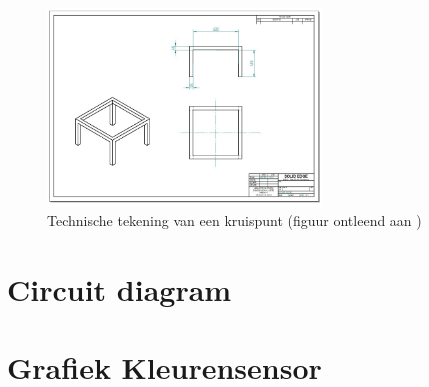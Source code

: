 \documentclass[a4paper,kulak]{kulakarticle}
\begin{document}
\begin{appendices}
\begin{figure}[h]
	\centering
	\includegraphics[width=0.65\textwidth]{tafelstel.png}
	\caption{Technische tekening van een kruispunt (figuur ontleend aan \cite{opgave})}
	\label{techtekkruispunt}
\end{figure}


\section{Circuit diagram}


\section*{Grafiek Kleurensensor}

\caption{De magnitudes van de roodwaarden voor metingen met interval 3 seconden voor 2 cycli van een verkeerslicht}
\label{grafiek}
\end{appendices}
\end{document}
